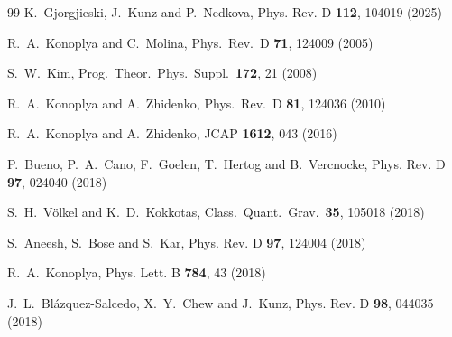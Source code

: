 \documentclass[11pt,a4paper]{article}
\begin{document}
\begin{thebibliography}{99}
K.~Gjorgjieski, J.~Kunz and P.~Nedkova,
Phys. Rev. D \textbf{112}, 104019 (2025)



  R.~A.~Konoplya and C.~Molina,
  Phys.\ Rev.\ D {\bf 71}, 124009 (2005)

  S.~W.~Kim,
  Prog.\ Theor.\ Phys.\ Suppl.\  {\bf 172}, 21 (2008)

  R.~A.~Konoplya and A.~Zhidenko,
  Phys.\ Rev.\ D {\bf 81}, 124036 (2010)

  R.~A.~Konoplya and A.~Zhidenko,
  JCAP {\bf 1612}, 043 (2016)

P.~Bueno, P.~A.~Cano, F.~Goelen, T.~Hertog and B.~Vercnocke,
Phys. Rev. D \textbf{97}, 024040 (2018)
  
  S.~H.~V\"olkel and K.~D.~Kokkotas,
  Class.\ Quant.\ Grav.\  {\bf 35}, 105018 (2018)

S.~Aneesh, S.~Bose and S.~Kar,
Phys. Rev. D \textbf{97}, 124004 (2018)

R.~A.~Konoplya,
Phys. Lett. B \textbf{784}, 43 (2018)

J.~L.~Bl\'azquez-Salcedo, X.~Y.~Chew and J.~Kunz,
Phys. Rev. D \textbf{98}, 044035 (2018)


\end{thebibliography}
\end{document}

